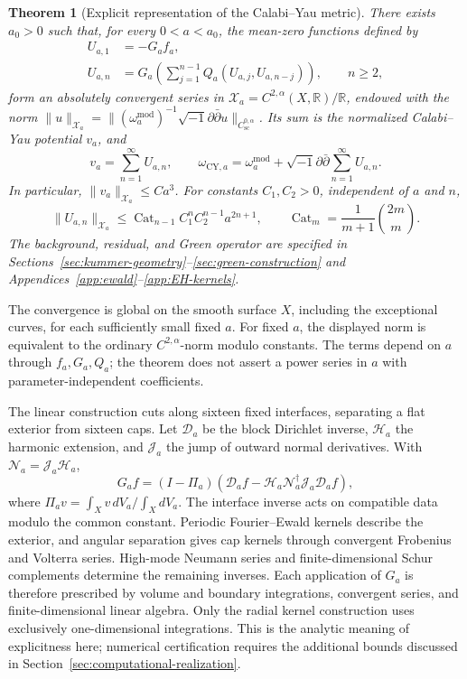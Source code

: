 \documentclass[11pt,a4paper,twoside]{article}
\numberwithin{equation}{section}
\newcommand{\ddc}{\sqrt{-1}\partial\bar\partial}
\newtheorem{theorem}{Theorem}[section]
\theoremstyle{definition}
\theoremstyle{remark}
\begin{document}
\begin{theorem}[Explicit representation of the Calabi--Yau metric]
\label{thm:main}
There exists \(a_0>0\) such that, for every \(0<a<a_0\), the
mean-zero functions defined by
\begin{equation}\label{eq:intro-recursion}
\begin{aligned}
U_{a,1}&=-G_af_a,\\
U_{a,n}&=G_a\!\left(\sum_{j=1}^{n-1}
Q_a(U_{a,j},U_{a,n-j})\right),\qquad n\ge2,
\end{aligned}
\end{equation}
form an absolutely convergent series in
\(\mathcal X_a=C^{2,\alpha}(X,\mathbb R)/\mathbb R\), endowed
with the norm
\(\|u\|_{\mathcal X_a}=\|(\omega_a^{\mathrm{mod}})^{-1}
\ddc u\|_{C_{\mathrm{sc}}^{0,\alpha}}\).
Its sum is the normalized Calabi--Yau potential \(v_a\), and
\begin{equation}\label{eq:main-metric}
v_a=\sum_{n=1}^{\infty}U_{a,n},
\qquad \omega_{\mathrm{CY},a}
=\omega_a^{\mathrm{mod}}+\ddc\sum_{n=1}^{\infty}U_{a,n}.
\end{equation}
In particular, \(\|v_a\|_{\mathcal X_a}\le Ca^3\). For constants
\(C_1,C_2>0\), independent of \(a\) and \(n\),
\[
\|U_{a,n}\|_{\mathcal X_a}
\le\operatorname{Cat}_{n-1}C_1^nC_2^{n-1}a^{2n+1},
\qquad \operatorname{Cat}_m=\frac1{m+1}\binom{2m}{m}.
\]
The background, residual, and Green operator are specified in
Sections~\ref{sec:kummer-geometry}--\ref{sec:green-construction}
and Appendices~\ref{app:ewald}--\ref{app:EH-kernels}.
\end{theorem}


The convergence is global on the smooth surface \(X\), including
the exceptional curves, for each sufficiently small fixed \(a\).
For fixed \(a\), the displayed norm is equivalent to the ordinary
\(C^{2,\alpha}\)-norm modulo constants. The terms depend on
\(a\) through \(f_a,G_a,Q_a\); the theorem does not assert a
power series in \(a\) with parameter-independent coefficients.

The linear construction cuts along sixteen fixed interfaces,
separating a flat exterior from sixteen caps. Let \(\mathcal D_a\)
be the block Dirichlet inverse, \(\mathcal H_a\) the harmonic
extension, and \(\mathcal J_a\) the jump of outward normal
derivatives. With \(\mathcal N_a=\mathcal J_a\mathcal H_a\),
\[
G_af=(I-\Pi_a)\left(\mathcal D_af
-\mathcal H_a\mathcal N_a^\dagger\mathcal J_a\mathcal D_af\right),
\]
where \(\Pi_av=\int_Xv\,dV_a/\int_XdV_a\). The interface
inverse acts on compatible data modulo the common constant.
Periodic Fourier--Ewald kernels describe the exterior, and angular
separation gives cap kernels through convergent Frobenius and
Volterra series. High-mode Neumann series and finite-dimensional
Schur complements determine the remaining inverses. Each
application of \(G_a\) is therefore prescribed by volume and
boundary integrations, convergent series, and finite-dimensional
linear algebra. Only the radial kernel construction uses exclusively
one-dimensional integrations. This is the analytic meaning of
explicitness here; numerical certification requires the additional
bounds discussed in Section~\ref{sec:computational-realization}.
\end{document}
